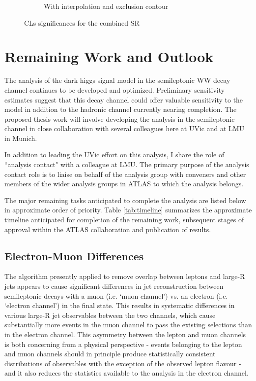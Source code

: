 \documentclass[12pt]{article}
\begin{document}
\begin{figure}[H]
\begin{subfigure}[b]{0.49\textwidth}
         \caption[]{With interpolation and exclusion contour}
         \label{fig:interp_sensitivity}
     \end{subfigure}
\caption[]{CLs significances for the combined SR}
\label{fig:sensitivity_full}
\end{figure}

\section{Remaining Work and Outlook}

The analysis of the dark higgs signal model in the semileptonic WW decay channel continues to be developed and optimized. Preliminary sensitivity estimates suggest that this decay channel could offer valuable sensitivity to the model in addition to the hadronic channel currently nearing completion. The proposed thesis work will involve developing the analysis in the semileptonic channel in close collaboration with several colleagues here at UVic and at LMU in Munich. 

In addition to leading the UVic effort on this analysis, I share the role of ``analysis contact" with a colleague at LMU. The primary purpose of the analysis contact role is to liaise on behalf of the analysis group with conveners and other members of the wider analysis groups in ATLAS to which the analysis belongs. 

The major remaining tasks anticipated to complete the analysis are listed below in approximate order of priority. Table \ref{tab:timeline} summarizes the approximate timeline anticipated for completion of the remaining work, subsequent stages of approval within the ATLAS collaboration and publication of results. 
 
\subsection{Electron-Muon Differences}

The  algorithm presently applied to remove overlap between leptons and large-R jets appears to cause significant differences in jet reconstruction between semileptonic decays with a muon (i.e. `muon channel') vs. an electron (i.e. `electron channel') in the final state. This results in systematic differences in various large-R jet observables between the two channels, which cause substantially more events in the muon channel to pass the existing selections than in the electron channel. This asymmetry between the lepton and muon channels is both concerning from a physical perspective - events belonging to the lepton and muon channels should in principle produce statistically consistent distributions of observables with the exception of the observed lepton flavour - and it also reduces the statistics available to the analysis in the electron channel. 
\end{document}
